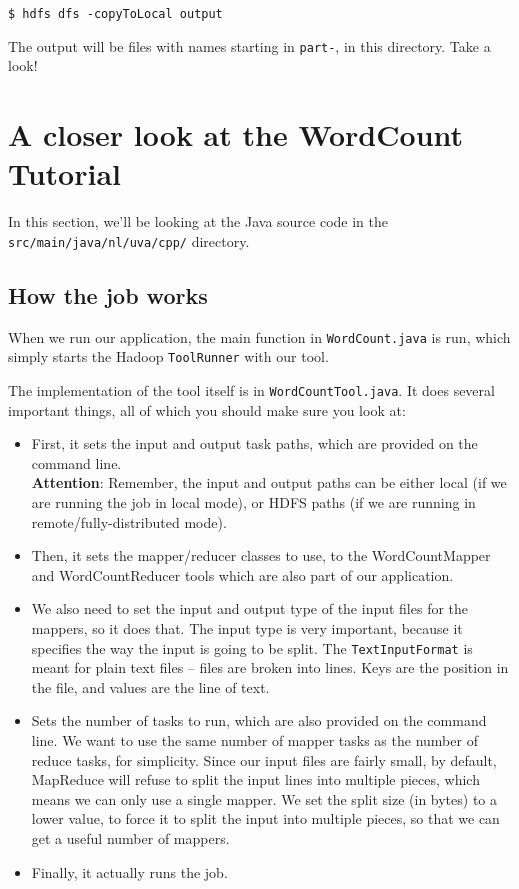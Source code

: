 \documentclass[a4paper,11pt]{article}
\begin{document}
\begin{lstlisting}
$ hdfs dfs -copyToLocal output
\end{lstlisting}

The output will be files with names starting in \texttt{part-}, in this directory. Take a look!
  
  \section{A closer look at the WordCount Tutorial}
  
  In this section, we'll be looking at the Java source code in the \texttt{src/main/java/nl/uva/cpp/} directory.

  \subsection{How the job works}

  When we run our application, the main function in \texttt{WordCount.java} is run, which simply starts the Hadoop
  \texttt{ToolRunner} with our tool.

  The implementation of the tool itself is in \texttt{WordCountTool.java}. It does several important things, all of which
  you should make sure you look at:

  \begin{itemize}
	  \item First, it sets the input and output task paths, which are provided on the command line. \\
		  \textbf{Attention}: Remember, the input and output paths can be either local (if we are running the job in local mode), or HDFS paths (if we are running in remote/fully-distributed mode).

	  \item Then, it sets the mapper/reducer classes to use, to the WordCountMapper and WordCountReducer tools which are
		  also part of our application.

	  \item We also need to set the input and output type of the input files for the mappers, so it does that.
  The input type is very important, because it specifies the way the input is going to be split. The \texttt{TextInputFormat} is meant for plain text files -- files are broken into lines. Keys are the position in the file, and values are the line of text.
  
	  \item Sets the number of tasks to run, which are also provided on the command line. We want to use the same number
		  of mapper tasks as the number of reduce tasks, for simplicity. Since our input files are fairly
		  small, by default, MapReduce will refuse to split the input lines into multiple pieces, which means
		  we can only use a single mapper. We set the split size (in bytes) to a lower value, to force it to
		  split the input into multiple pieces, so that we can get a useful number of mappers.

	  \item Finally, it actually runs the job.
  \end{itemize}
\end{document}
